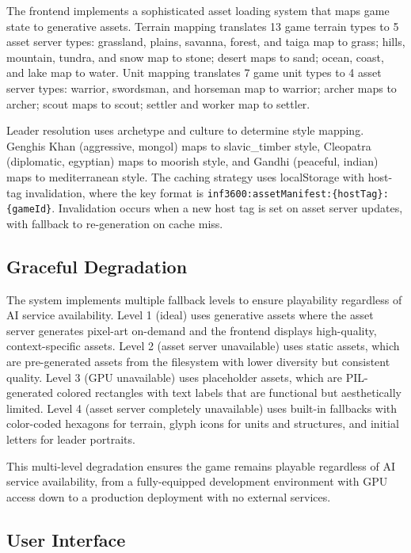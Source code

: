 \documentclass[conference]{IEEEtran}
\begin{document}
The frontend implements a sophisticated asset loading system that maps game state to generative assets. Terrain mapping translates 13 game terrain types to 5 asset server types: grassland, plains, savanna, forest, and taiga map to grass; hills, mountain, tundra, and snow map to stone; desert maps to sand; ocean, coast, and lake map to water. Unit mapping translates 7 game unit types to 4 asset server types: warrior, swordsman, and horseman map to warrior; archer maps to archer; scout maps to scout; settler and worker map to settler.

Leader resolution uses archetype and culture to determine style mapping. Genghis Khan (aggressive, mongol) maps to slavic\_timber style, Cleopatra (diplomatic, egyptian) maps to moorish style, and Gandhi (peaceful, indian) maps to mediterranean style. The caching strategy uses localStorage with host-tag invalidation, where the key format is \texttt{inf3600:assetManifest:\{hostTag\}:\{gameId\}}. Invalidation occurs when a new host tag is set on asset server updates, with fallback to re-generation on cache miss.

\subsection{Graceful Degradation}

The system implements multiple fallback levels to ensure playability regardless of AI service availability. Level 1 (ideal) uses generative assets where the asset server generates pixel-art on-demand and the frontend displays high-quality, context-specific assets. Level 2 (asset server unavailable) uses static assets, which are pre-generated assets from the filesystem with lower diversity but consistent quality. Level 3 (GPU unavailable) uses placeholder assets, which are PIL-generated colored rectangles with text labels that are functional but aesthetically limited. Level 4 (asset server completely unavailable) uses built-in fallbacks with color-coded hexagons for terrain, glyph icons for units and structures, and initial letters for leader portraits.

This multi-level degradation ensures the game remains playable regardless of AI service availability, from a fully-equipped development environment with GPU access down to a production deployment with no external services.

\subsection{User Interface}
\end{document}
